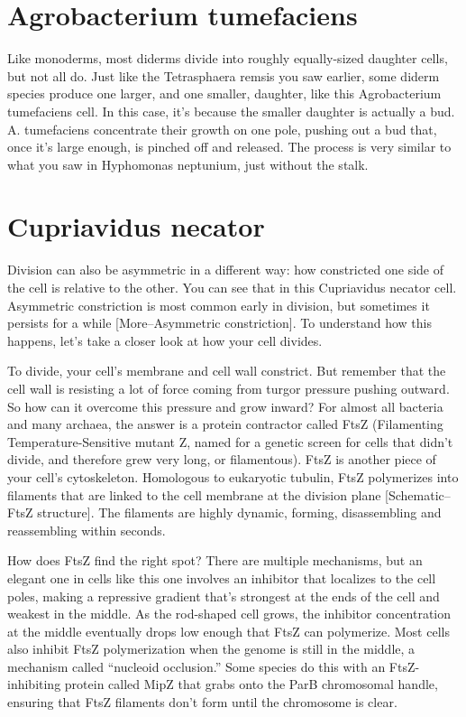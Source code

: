 \documentclass[]{tufte-book}
\begin{document}
\section{Agrobacterium tumefaciens}\label{agrobacterium-tumefaciens-1}

Like monoderms, most diderms divide into roughly equally-sized daughter
cells, but not all do. Just like the Tetrasphaera remsis you saw
earlier, some diderm species produce one larger, and one smaller,
daughter, like this Agrobacterium tumefaciens cell. In this case, it's
because the smaller daughter is actually a bud. A. tumefaciens
concentrate their growth on one pole, pushing out a bud that, once it's
large enough, is pinched off and released. The process is very similar
to what you saw in Hyphomonas neptunium, just without the stalk.

\section{Cupriavidus necator}\label{cupriavidus-necator-3}

Division can also be asymmetric in a different way: how constricted one
side of the cell is relative to the other. You can see that in this
Cupriavidus necator cell. Asymmetric constriction is most common early
in division, but sometimes it persists for a while {[}More--Asymmetric
constriction{]}. To understand how this happens, let's take a closer
look at how your cell divides.

To divide, your cell's membrane and cell wall constrict. But remember
that the cell wall is resisting a lot of force coming from turgor
pressure pushing outward. So how can it overcome this pressure and grow
inward? For almost all bacteria and many archaea, the answer is a
protein contractor called FtsZ (Filamenting Temperature-Sensitive mutant
Z, named for a genetic screen for cells that didn't divide, and
therefore grew very long, or filamentous). FtsZ is another piece of your
cell's cytoskeleton. Homologous to eukaryotic tubulin, FtsZ polymerizes
into filaments that are linked to the cell membrane at the division
plane {[}Schematic--FtsZ structure{]}. The filaments are highly dynamic,
forming, disassembling and reassembling within seconds.

How does FtsZ find the right spot? There are multiple mechanisms, but an
elegant one in cells like this one involves an inhibitor that localizes
to the cell poles, making a repressive gradient that's strongest at the
ends of the cell and weakest in the middle. As the rod-shaped cell
grows, the inhibitor concentration at the middle eventually drops low
enough that FtsZ can polymerize. Most cells also inhibit FtsZ
polymerization when the genome is still in the middle, a mechanism
called ``nucleoid occlusion.'' Some species do this with an
FtsZ-inhibiting protein called MipZ that grabs onto the ParB chromosomal
handle, ensuring that FtsZ filaments don't form until the chromosome is
clear.
\end{document}
